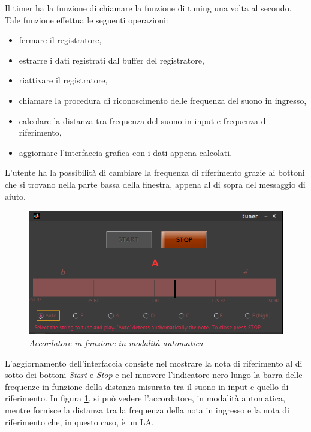 Il timer ha la funzione di chiamare la funzione di tuning una volta al secondo. 
Tale funzione effettua le seguenti operazioni:
\begin{itemize}
	\item fermare il registratore,
	\item estrarre i dati registrati dal buffer del registratore,
	\item riattivare il registratore,
	\item chiamare la procedura di riconoscimento delle frequenza del suono in ingresso,
	\item calcolare la distanza tra frequenza del suono in input e frequenza di riferimento,
	\item aggiornare l'interfaccia grafica con i dati appena calcolati.
\end{itemize}

L'utente ha la possibilità di cambiare la frequenza di riferimento grazie ai bottoni che si trovano nella parte bassa della finestra, appena al di sopra del messaggio di aiuto.

	\begin{figure}[h]
	  \begin{center} 
	    \includegraphics[width=\textwidth*\real{0.8}]{images/ch_07/accordatore_auto.png}
	  \end{center} 
	  \caption{\textit{Accordatore in funzione in modalità automatica}}  
	  \label{fig:accordatore_in_funzione}
	\end{figure}

L'aggiornamento dell'interfaccia consiste nel mostrare la nota di riferimento al di sotto dei bottoni \emph{Start} e \emph{Stop} e nel muovere l'indicatore nero lungo la barra delle frequenze in funzione della distanza misurata tra il suono in input e quello di riferimento. 
In figura \ref{fig:accordatore_in_funzione}, si può vedere l'accordatore, in modalità automatica, mentre fornisce la distanza tra la frequenza della nota in ingresso e la nota di riferimento che, in questo caso, è un LA.



